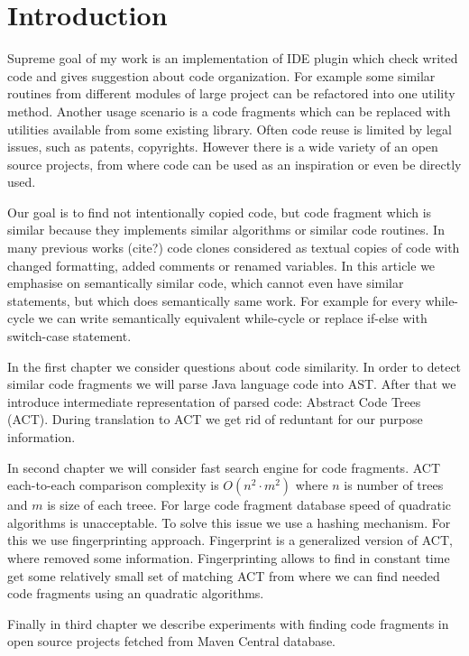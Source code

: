 \section*{Introduction}

Supreme goal of my work is an implementation of IDE plugin which check writed code and gives suggestion about code
organization. For example some similar routines from different modules of large project can be refactored 
into one utility method. Another usage scenario is a code fragments which can be replaced with utilities available from
some existing library. Often code reuse is limited by legal
issues, such as patents, copyrights. However there is a wide variety of an open source
projects, from where code can be used as an inspiration or even be directly
used.

Our goal is  to find not intentionally copied code, but code fragment which is similar because they
implements similar algorithms or similar code routines. In many previous works (cite?) code clones considered
as textual copies of code with changed formatting, added comments or renamed variables. 
In this article we emphasise on semantically similar code, which cannot even have similar statements, but which does
semantically same work. For example for every while-cycle we can write semantically equivalent while-cycle or replace
if-else with switch-case statement.

In the first chapter we consider questions about code similarity. In order to detect similar code
fragments we will parse Java language code into AST.
After that we introduce intermediate representation of parsed code: Abstract Code Trees (ACT).
During translation to ACT we get rid of reduntant for our purpose information.

In second chapter we will consider fast search engine for code fragments. ACT
each-to-each comparison complexity is $O(n^2 \cdot m^2)$ where $n$ is number of
trees and $m$ is size of each treee. For large code fragment database speed of
quadratic algorithms is unacceptable. To solve this issue we use a
hashing mechanism. For this we use fingerprinting approach.
Fingerprint is a generalized version of ACT, where removed some information. Fingerprinting allows to find in
constant time get some relatively small set of matching ACT from where we can find needed code fragments using an
quadratic algorithms.

Finally in third chapter we describe experiments with finding code fragments in
open source projects fetched from Maven Central database.

